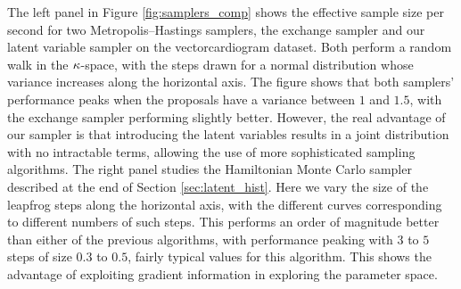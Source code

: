 The left panel in Figure \ref{fig:samplers_comp} shows the effective sample size per second for two
Metropolis--Hastings samplers, the exchange sampler and our latent variable sampler on the vectorcardiogram dataset.
Both 
perform a random walk in the $\kappa$-space, with the steps drawn for a normal
distribution whose variance increases along the horizontal axis.
The figure shows that both samplers' performance
peaks when the proposals have a variance between $1$ and $1.5$, with the
exchange sampler performing slightly better. However, 
the real advantage of our sampler is that introducing the latent variables
results in a joint distribution with no intractable terms,
allowing the use of more sophisticated sampling algorithms. The right panel studies the Hamiltonian
Monte Carlo sampler described at the end of Section \ref{sec:latent_hist}. Here we
vary the size of the leapfrog steps along the horizontal axis, with the different
curves corresponding to different numbers of such steps.
This performs an order of magnitude better than either of the previous
algorithms, with performance peaking with $3$ to $5$ steps of size $0.3$ to
$0.5$, fairly typical values for this algorithm. This shows the advantage of exploiting
gradient information in exploring the parameter space.


